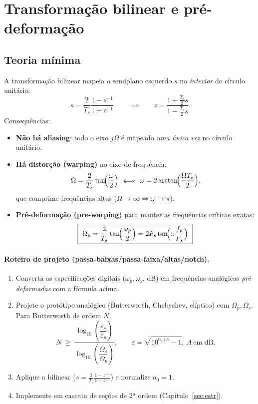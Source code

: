 \section{Transformação bilinear e pré-deformação}\label{sec:bilinear}

\subsection*{Teoria mínima}

A transformação bilinear mapeia o semiplano esquerdo $s$ no \emph{interior} do
círculo unitário:
\[
  \boxed{\ s=\frac{2}{T_s}\frac{1-z^{-1}}{1+z^{-1}}\ }
  \qquad\Longleftrightarrow\qquad
  z=\frac{1+\frac{T_s}{2}s}{1-\frac{T_s}{2}s}.
\]
Consequências:
\begin{itemize}
  \item \textbf{Não há aliasing}: todo o eixo $j\Omega$ é mapeado
        \emph{uma única vez} no círculo unitário.
  \item \textbf{Há distorção (warping)} no eixo de frequência:
        \[
          \Omega=\frac{2}{T_s}\tan\!\Bigl(\frac{\omega}{2}\Bigr)
          \ \Longleftrightarrow\
          \omega=2\arctan\!\Bigl(\frac{\Omega T_s}{2}\Bigr),
        \]
        que comprime frequências altas ($\Omega\to\infty\Rightarrow\omega\to\pi$).
  \item \textbf{Pré-deformação (pre-warping)} para manter as frequências
        críticas exatas:
        \[
          \boxed{\ \Omega_p=\frac{2}{T_s}\tan\!\Bigl(\frac{\omega_p}{2}\Bigr)
          =2F_s\tan\!\Bigl(\pi\frac{f_p}{F_s}\Bigr)\ }
        \]
\end{itemize}

\paragraph{Roteiro de projeto (passa-baixas/passa-faixa/altas/notch).}
\begin{enumerate}
  \item Converta as especificações digitais ($\omega_p,\omega_s$, dB) em
        frequências analógicas \emph{pré-deformadas} com a fórmula acima.
  \item Projete o protótipo analógico (Butterworth, Chebyshev, elíptico) com
        $\Omega_p,\Omega_s$. Para Butterworth de ordem $N$,
        \[
          N\ \ge\
          \frac{\log_{10}\!\left(\dfrac{\varepsilon_s}{\varepsilon_p}\right)}
               {\log_{10}\!\left(\dfrac{\Omega_s}{\Omega_p}\right)},
          \qquad
          \varepsilon=\sqrt{10^{0{,}1A}-1},\ A\ \text{em dB}.
        \]
  \item Aplique a bilinear ($s=\frac{2}{T_s}\frac{1-z^{-1}}{1+z^{-1}}$) e
        normalize $a_0=1$.
  \item Implemente em cascata de seções de 2ª ordem (Capítulo~\ref{sec:estr}).
\end{enumerate}

